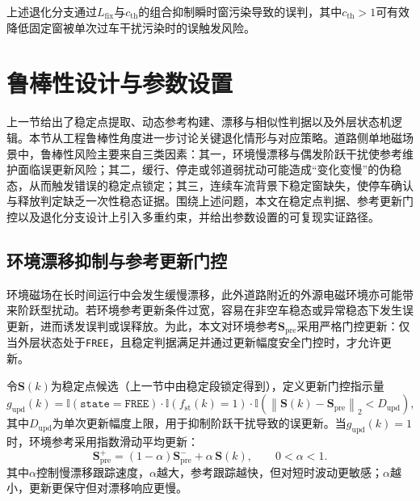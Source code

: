 \documentclass{xdupgthesis}
\begin{document}
上述退化分支通过$L_{\mathrm{fix}}$与$c_{\mathrm{th}}$的组合抑制瞬时窗污染导致的误判，其中$c_{\mathrm{th}}>1$可有效降低固定窗被单次过车干扰污染时的误触发风险。

\section{鲁棒性设计与参数设置}
\label{sec:ch4_robust}

上一节给出了稳定点提取、动态参考构建、漂移与相似性判据以及外层状态机逻辑。本节从工程鲁棒性角度进一步讨论关键退化情形与对应策略。道路侧单地磁场景中，鲁棒性风险主要来自三类因素：其一，环境慢漂移与偶发阶跃干扰使参考维护面临误更新风险；其二，缓行、停走或邻道弱扰动可能造成“变化变慢”的伪稳态，从而触发错误的稳定点锁定；其三，连续车流背景下稳定窗缺失，使停车确认与释放判定缺乏一次性稳态证据。围绕上述问题，本文在稳定点判据、参考更新门控以及退化分支设计上引入多重约束，并给出参数设置的可复现实证路径。

\subsection{环境漂移抑制与参考更新门控}
\label{subsec:ch4_drift_gate}

环境磁场在长时间运行中会发生缓慢漂移，此外道路附近的外源电磁环境亦可能带来阶跃型扰动。若环境参考更新条件过宽，容易在非空车稳态或异常稳态下发生误更新，进而诱发误判或误释放。为此，本文对环境参考$\mathbf{S}_{\mathrm{pre}}$采用严格门控更新：仅当外层状态处于\texttt{FREE}，且稳定判据满足并通过更新幅度安全门控时，才允许更新。

令$\mathbf{S}(k)$为稳定点候选（上一节中由稳定段锁定得到），定义更新门控指示量
\begin{equation}
g_{\mathrm{upd}}(k) =
\mathbb{I}\!\left(\texttt{state}=\texttt{FREE}\right)\cdot
\mathbb{I}\!\left(f_{\mathrm{st}}(k)=1\right)\cdot
\mathbb{I}\!\left(\left\lVert \mathbf{S}(k)-\mathbf{S}_{\mathrm{pre}}\right\rVert_2 < D_{\mathrm{upd}}\right),
\label{eq:ch4_upd_gate}
\end{equation}
其中$D_{\mathrm{upd}}$为单次更新幅度上限，用于抑制阶跃干扰导致的误更新。当$g_{\mathrm{upd}}(k)=1$时，环境参考采用指数滑动平均更新：
\begin{equation}
\mathbf{S}_{\mathrm{pre}}^{+} = (1-\alpha)\mathbf{S}_{\mathrm{pre}}^{-} + \alpha\,\mathbf{S}(k),\qquad 0<\alpha<1.
\label{eq:ch4_ema_update_refine}
\end{equation}
其中$\alpha$控制慢漂移跟踪速度，$\alpha$越大，参考跟踪越快，但对短时波动更敏感；$\alpha$越小，更新更保守但对漂移响应更慢。
\end{document}
